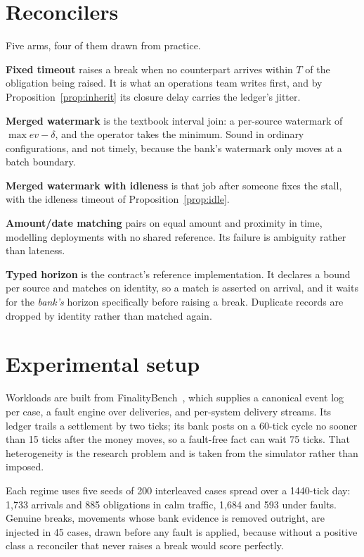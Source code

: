 \documentclass[10pt,conference]{IEEEtran}
\begin{document}
\section{Reconcilers}

Five arms, four of them drawn from practice.

\textbf{Fixed timeout} raises a break when no counterpart arrives within $T$ of
the obligation being raised. It is what an operations team writes first, and by
Proposition~\ref{prop:inherit} its closure delay carries the ledger's jitter.

\textbf{Merged watermark} is the textbook interval join: a per-source watermark
of $\max \mathit{ev} - \delta$, and the operator takes the minimum. Sound in
ordinary configurations, and not timely, because the bank's watermark only moves
at a batch boundary.

\textbf{Merged watermark with idleness} is that job after someone fixes the
stall, with the idleness timeout of Proposition~\ref{prop:idle}.

\textbf{Amount/date matching} pairs on equal amount and proximity in time,
modelling deployments with no shared reference. Its failure is ambiguity rather
than lateness.

\textbf{Typed horizon} is the contract's reference implementation. It declares a bound per source and matches on identity, so a match is asserted
on arrival, and it waits for the \emph{bank's} horizon specifically before
raising a break.
Duplicate records are dropped by identity rather than matched again.

\section{Experimental setup}

Workloads are built from FinalityBench~\cite{finalitybench}, which supplies a
canonical event log per case, a fault engine over deliveries, and per-system
delivery streams. Its ledger trails a settlement by two ticks; its bank posts on
a 60-tick cycle no sooner than 15 ticks after the money moves, so a fault-free
fact can wait 75 ticks. That heterogeneity is the research problem and is taken
from the simulator rather than imposed.

Each regime uses five seeds of 200 interleaved cases spread over a 1440-tick
day: 1{,}733 arrivals and 885 obligations in calm traffic, 1{,}684 and 593 under
faults. Genuine breaks, movements whose bank evidence is removed outright, are
injected in 45 cases, drawn before any fault is applied, because without a
positive class a reconciler that never raises a break would score perfectly.
\end{document}

